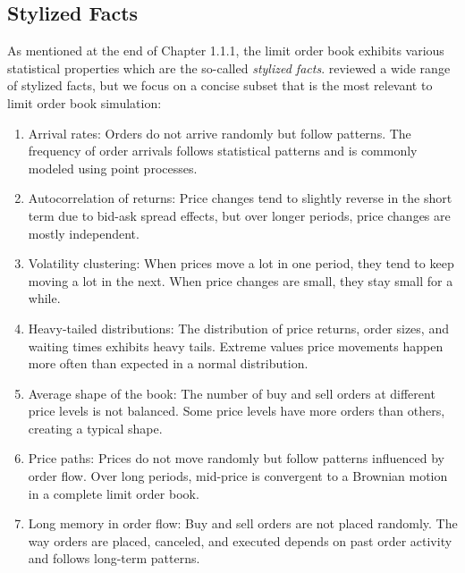 \subsection{Stylized Facts} \label{cp: facts}
As mentioned at the end of Chapter 1.1.1, the limit order book exhibits various statistical properties which are the so-called \textit{stylized facts}. \cite{vyetrenko2019realrealismmetricsrobust} reviewed a wide range of stylized facts, but we focus on a concise subset that is the most relevant to limit order book simulation:
\begin{enumerate}
    \item Arrival rates: Orders do not arrive randomly but follow patterns. The frequency of order arrivals follows statistical patterns and is commonly modeled using point processes.
    \item Autocorrelation of returns: Price changes tend to slightly reverse in the short term due to bid-ask spread effects, but over longer periods, price changes are mostly independent.
    \item Volatility clustering: When prices move a lot in one period, they tend to keep moving a lot in the next. When price changes are small, they stay small for a while.
    \item Heavy-tailed distributions: The distribution of price returns, order sizes, and waiting times exhibits heavy tails. Extreme values price movements happen more often than expected in a normal distribution.
    \item Average shape of the book: The number of buy and sell orders at different price levels is not balanced. Some price levels have more orders than others, creating a typical shape.
    \item Price paths: Prices do not move randomly but follow patterns influenced by order flow. Over long periods, mid-price is convergent to a Brownian motion in a complete limit order book. 
    \item Long memory in order flow: Buy and sell orders are not placed randomly. The way orders are placed, canceled, and executed depends on past order activity and follows long-term patterns.
\end{enumerate}


